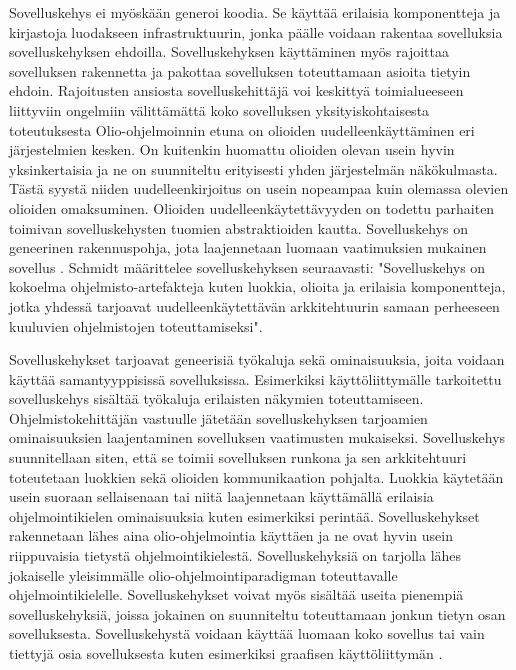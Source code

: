 \documentclass[utf8]{gradu3}
\begin{document}
Sovelluskehys ei myöskään generoi koodia. Se käyttää erilaisia komponentteja ja kirjastoja luodakseen infrastruktuurin, jonka päälle voidaan rakentaa sovelluksia sovelluskehyksen ehdoilla. Sovelluskehyksen käyttäminen myös rajoittaa sovelluksen rakennetta ja pakottaa sovelluksen toteuttamaan asioita tietyin ehdoin. Rajoitusten ansiosta sovelluskehittäjä voi keskittyä toimialueeseen liittyviin ongelmiin välittämättä koko sovelluksen yksityiskohtaisesta toteutuksesta
Olio-ohjelmoinnin etuna on olioiden uudelleenkäyttäminen eri järjestelmien kesken. On kuitenkin huomattu olioiden olevan usein hyvin yksinkertaisia ja ne on suunniteltu erityisesti yhden järjestelmän näkökulmasta. Tästä syystä niiden uudelleenkirjoitus on usein nopeampaa kuin olemassa olevien olioiden omaksuminen. Olioiden uudelleenkäytettävyyden on todettu parhaiten toimivan sovelluskehysten tuomien abstraktioiden kautta. Sovelluskehys on geneerinen rakennuspohja, jota laajennetaan luomaan vaatimuksien mukainen sovellus \parencite[s. 431]{Sommerville}. Schmidt \parencite{frameworks} määrittelee sovelluskehyksen seuraavasti: "Sovelluskehys on kokoelma ohjelmisto-artefakteja kuten luokkia, olioita ja erilaisia komponentteja, jotka yhdessä tarjoavat uudelleenkäytettävän arkkitehtuurin samaan perheeseen kuuluvien ohjelmistojen toteuttamiseksi".

Sovelluskehykset tarjoavat geneerisiä työkaluja sekä ominaisuuksia, joita voidaan käyttää samantyyppisissä sovelluksissa. Esimerkiksi käyttöliittymälle tarkoitettu sovelluskehys sisältää työkaluja erilaisten näkymien toteuttamiseen. Ohjelmistokehittäjän vastuulle jätetään sovelluskehyksen tarjoamien ominaisuuksien laajentaminen sovelluksen vaatimusten mukaiseksi. Sovelluskehys suunnitellaan siten, että se toimii sovelluksen runkona ja sen arkkitehtuuri toteutetaan luokkien sekä olioiden kommunikaation pohjalta. Luokkia käytetään usein suoraan sellaisenaan tai niitä laajennetaan käyttämällä erilaisia ohjelmointikielen ominaisuuksia kuten esimerkiksi perintää. Sovelluskehykset rakennetaan lähes aina olio-ohjelmointia käyttäen ja ne ovat hyvin usein riippuvaisia tietystä ohjelmointikielestä. Sovelluskehyksiä on tarjolla lähes jokaiselle yleisimmälle olio-ohjelmointiparadigman toteuttavalle ohjelmointikielelle. Sovelluskehykset voivat myös sisältää useita pienempiä sovelluskehyksiä, joissa jokainen on suunniteltu toteuttamaan jonkun tietyn osan sovelluksesta. Sovelluskehystä voidaan käyttää luomaan koko sovellus tai vain tiettyjä osia sovelluksesta kuten esimerkiksi graafisen käyttöliittymän \parencite[s. 431]{Sommerville}.
\end{document}
